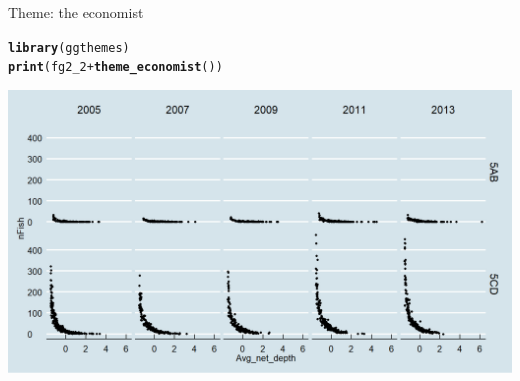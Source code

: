 \documentclass{beamer}\usepackage[]{graphicx}\usepackage[]{color}
\makeatletter
\newcommand{\hlopt}[1]{\textcolor[rgb]{0,0,0}{#1}}%
\newcommand{\hlstd}[1]{\textcolor[rgb]{0.345,0.345,0.345}{#1}}%
\newcommand{\hlkwd}[1]{\textcolor[rgb]{0.737,0.353,0.396}{\textbf{#1}}}%
\newenvironment{kframe}{%
 \def\at@end@of@kframe{}%
 \ifinner\ifhmode%
  \def\at@end@of@kframe{\end{minipage}}%
  \begin{minipage}{\columnwidth}%
 \fi\fi%
 \def\FrameCommand##1{\hskip\@totalleftmargin \hskip-\fboxsep
 \colorbox{shadecolor}{##1}\hskip-\fboxsep
     \hskip-\linewidth \hskip-\@totalleftmargin \hskip\columnwidth}%
 \MakeFramed {\advance\hsize-\width
   \@totalleftmargin\z@ \linewidth\hsize
   \@setminipage}}%
 {\par\unskip\endMakeFramed%
 \at@end@of@kframe}
\newenvironment{knitrout}{}{} %
\makeatother
\begin{document}
\begin{frame}[fragile]{Theme: the economist}
\begin{knitrout}\footnotesize
{}\color{fgcolor}\begin{kframe}
\begin{alltt}
\hlkwd{library}\hlstd{(ggthemes)}
\hlkwd{print}\hlstd{(fg2_2} \hlopt{+} \hlkwd{theme_economist}\hlstd{())}
\end{alltt}
\end{kframe}

{\centering \includegraphics[width=.9\linewidth]{figure/theme_6-1} 

}



\end{knitrout}
\end{frame}
\end{document}
